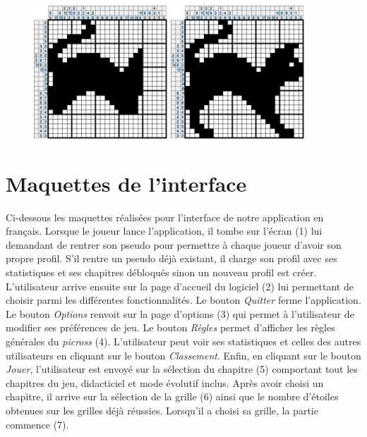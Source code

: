 \documentclass{report}
\begin{document}
\begin{figure}[H]
			\hspace{1cm}
          		\includegraphics[width=5cm]{../Images/cat/cat5.png}
			\hspace{1cm}
			\includegraphics[width=5cm]{../Images/cat/cat6.png}
		\end{figure}
		
	
	\section{Maquettes de l'interface}
      
      		Ci-dessous les maquettes réalisées pour l'interface de notre application en français. Lorsque le joueur lance l'application, il tombe sur l'écran (1) lui demandant de rentrer son pseudo pour permettre à chaque joueur d'avoir son propre profil. S'il rentre un pseudo déjà existant, il charge son profil avec ses statistiques et ses chapitres débloqués sinon un nouveau profil est créer. L'utilisateur arrive ensuite sur la page d'accueil du logiciel (2) lui permettant de choisir parmi les différentes fonctionnalités. Le bouton \textit{Quitter} ferme l'application. Le bouton \textit{Options} renvoit sur la page d'options (3) qui permet à l'utilisateur de modifier ses préférences de jeu. Le bouton \textit{Règles}  permet d'afficher les règles générales du \textit{picross} (4). L'utilisateur peut voir ses statistiques et celles des autres utilisateurs en cliquant sur le bouton \textit{Classement}. Enfin, en cliquant sur le bouton \textit{Jouer}, l'utilisateur est envoyé sur la sélection du  chapitre (5) comportant tout les chapitres du jeu, didacticiel et mode évolutif inclus. Après avoir choisi un chapitre, il arrive sur la sélection de la grille (6) ainsi que le nombre d'étoiles obtenues sur les grilles déjà réussies. Lorsqu'il a choisi sa grille, la partie commence (7).
		
\end{document}
